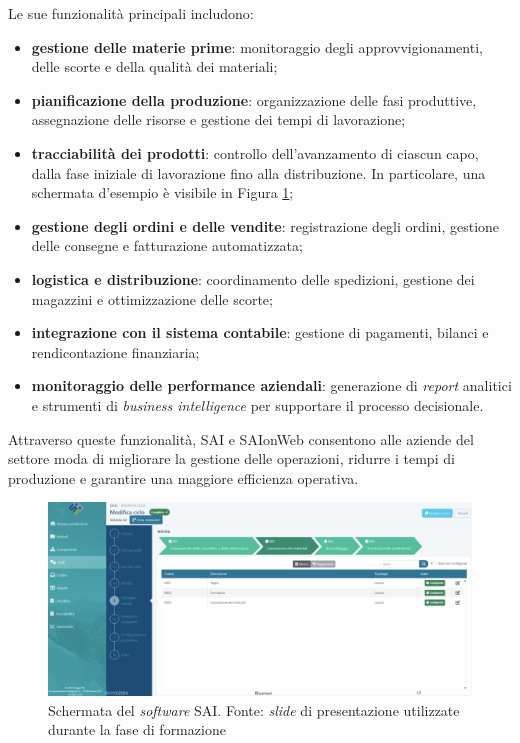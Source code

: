         \vspace{0.2 em}
        \noindent Le sue funzionalità principali includono:  
        \begin{itemize}
            \item \textbf{gestione delle materie prime}: monitoraggio degli approvvigionamenti, delle scorte e della qualità dei materiali;
            \item \textbf{pianificazione della produzione}: organizzazione delle fasi produttive, assegnazione delle risorse e gestione dei tempi di lavorazione;
            \item \textbf{tracciabilità dei prodotti}: controllo dell'avanzamento di ciascun capo, dalla fase iniziale di lavorazione fino alla distribuzione. In particolare, una schermata d'esempio è visibile in Figura \ref{fig:screenSAI};
            \item \textbf{gestione degli ordini e delle vendite}: registrazione degli ordini, gestione delle consegne e fatturazione automatizzata;
            \item \textbf{logistica e distribuzione}: coordinamento delle spedizioni, gestione dei magazzini e ottimizzazione delle scorte;
            \item \textbf{integrazione con il sistema contabile}: gestione di pagamenti, bilanci e rendicontazione finanziaria;
            \item \textbf{monitoraggio delle performance aziendali}: generazione di \textit{report} analitici e strumenti di \textit{business intelligence} per supportare il processo decisionale.  
        \end{itemize}

        \vspace{0.2 em}
        \noindent Attraverso queste funzionalità, SAI e SAIonWeb consentono alle aziende del settore moda di migliorare la gestione delle operazioni, ridurre i tempi di produzione e garantire una maggiore efficienza operativa.

        \begin{figure}[H]
            \centering
            \includegraphics[width=1.0\linewidth]{BCS-Tessi//images/schermata_SAI.png}
            \caption[Schermata del \textit{software} SAI di SogeaSoft S.r.l.]{Schermata del \textit{software} SAI. Fonte: \textit{slide} di presentazione utilizzate durante la fase di formazione}
            \label{fig:screenSAI}
        \end{figure}
        
